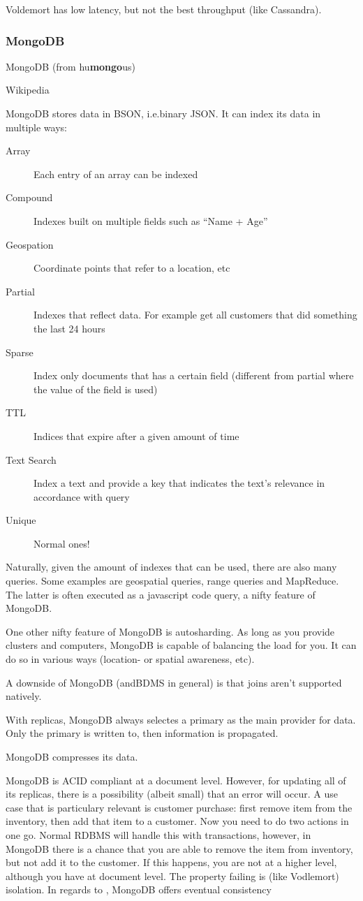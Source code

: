 Voldemort has low latency, but not the best throughput (like Cassandra).

\subsubsection{MongoDB}\label{sec:mongodb}
\epigraph{MongoDB (from hu\textbf{mongo}us)}{Wikipedia}

MongoDB stores data in BSON, i.e.\@ binary JSON. It can index its data in multiple ways:
\begin{description}
    \item[Array] Each entry of an array can be indexed
    \item[Compound] Indexes built on multiple fields such as ``Name  + Age''
    \item[Geospation] Coordinate points that refer to a location, etc
    \item[Partial] Indexes that reflect data. For example get all customers that did something the last 24 hours
    \item[Sparse] Index only documents that has a certain field (different from partial where the value of the field is used)
    \item[TTL] Indices that expire after a given amount of time
    \item[Text Search] Index a text and provide a key that indicates the text's relevance in accordance with query
    \item[Unique] Normal ones!
\end{description}

Naturally, given the amount of indexes that can be used, there are also many queries.
Some examples are geospatial queries, range queries and MapReduce. The latter is often
executed as a javascript code query, a nifty feature of MongoDB.

One other nifty feature of MongoDB is autosharding. As long as you provide clusters
and computers, MongoDB is capable of balancing the load for you. It can do so in various ways
(location- or spatial awareness, etc).

A downside of MongoDB (andBDMS in general) is that joins
aren't supported natively. 

With replicas, MongoDB always selectes a primary as the main provider for data.
Only the primary is written to, then information is propagated.

MongoDB compresses its data.

MongoDB is ACID compliant at a document level. However, for updating all of its replicas, 
there is a possibility (albeit small) that an error will occur. A use case that is particulary relevant
is customer purchase: first remove item from the inventory, then add that item to a customer.
Now you need to do two actions in one go. Normal RDBMS will handle this with transactions,
however, in MongoDB there is a chance that you are able to remove the item from inventory, but not add
it to the customer. If this happens, you are not  at a higher level, although you have  at document level. The property failing is (like Vodlemort) isolation.
In regards to , MongoDB offers eventual consistency

